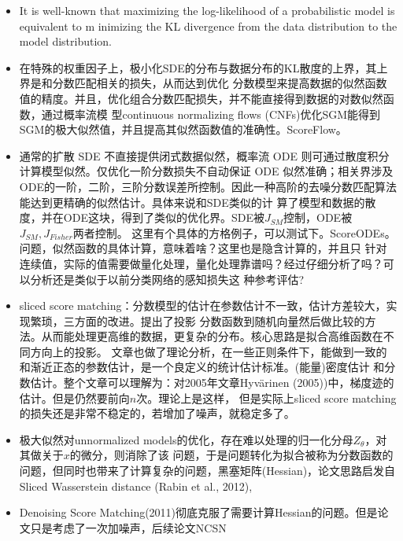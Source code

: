 \begin{itemize}
  同时假设了与 DDPM设定前向为马尔科夫性之后，推导出的逆向中条件后验分布为高斯分布 同等形式的 高斯分布。DDIM是通过
  什么，带来的推理加速(逆向采样几乎一样，多了一个$\sigma^2_{t}$，在附录C.1中说明了是通过DDPM的逆采样的子序列采样
  得到)？ 但是奇怪的是，DDIM的训练，竟然是变分去噪或者分数模型。其实差不多，这点需要代码上确认下区别。在实际中，DDIM
  的效果并不怎么样，后续的SDE均比它好很多。
  \item It is well-known that maximizing the log-likelihood of a probabilistic model is equivalent to m
  inimizing the KL divergence from the data distribution to the model distribution.
  \item 在特殊的权重因子上，极小化SDE的分布与数据分布的KL散度的上界，其上界是和分数匹配相关的损失，从而达到优化
  分数模型来提高数据的似然函数值的精度。并且，优化组合分数匹配损失，并不能直接得到数据的对数似然函数，通过概率流模
  型continuous normalizing flows (CNFs)优化SGM能得到SGM的极大似然值，并且提高其似然函数值的准确性。ScoreFlow。
  \item 通常的扩散 SDE 不直接提供闭式数据似然，概率流 ODE 则可通过散度积分计算模型似然。仅优化一阶分数损失不自动保证 ODE 似然准确；相关界涉及
  ODE的一阶，二阶，三阶分数误差所控制。因此一种高阶的去噪分数匹配算法能达到更精确的似然估计。具体来说和SDE类似的计
  算了模型和数据的散度，并在ODE这块，得到了类似的优化界。SDE被$J_{SM}$控制，ODE被$J_{SM}, J_{Fisher}$两者控制。
  这里有个具体的方格例子，可以测试下。ScoreODEs。 问题，似然函数的具体计算，意味着啥？这里也是隐含计算的，并且只
  针对连续值，实际的值需要做量化处理，量化处理靠谱吗？经过仔细分析了吗？可以分析还是类似于以前分类网络的感知损失这
  种参考评估?
  \item sliced  score matching：分数模型的估计在参数估计不一致，估计方差较大，实现繁琐，三方面的改进。提出了投影
  分数函数到随机向量然后做比较的方法。从而能处理更高维的数据，更复杂的分布。核心思路是拟合高维函数在不同方向上的投影。
  文章也做了理论分析，在一些正则条件下，能做到一致的和渐近正态的参数估计，是一个良定义的统计估计标准。(能量)密度估计
  和分数估计。整个文章可以理解为：对2005年文章Hyvärinen (2005))中，梯度迹的估计。但是仍然要前向$n$次。理论上是这样，
  但是实际上sliced  score matching的损失还是非常不稳定的，若增加了噪声，就稳定多了。
  \item 极大似然对unnormalized  models的优化，存在难以处理的归一化分母$Z_\theta$，对其做关于$x$的微分，则消除了该
  问题，于是问题转化为拟合被称为分数函数的问题，但同时也带来了计算复杂的问题，黑塞矩阵(Hessian)，论文思路启发自
  Sliced Wasserstein distance (Rabin et al., 2012),
  \item Denoising Score Matching(2011)彻底克服了需要计算Hessian的问题。但是论文只是考虑了一次加噪声，后续论文NCSN

\end{itemize}
